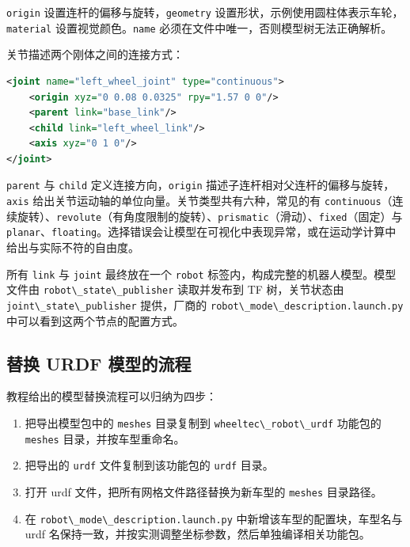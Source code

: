 \passthrough{\lstinline!origin!}
设置连杆的偏移与旋转，\passthrough{\lstinline!geometry!}
设置形状，示例使用圆柱体表示车轮，\passthrough{\lstinline!material!}
设置视觉颜色。\passthrough{\lstinline!name!}
必须在文件中唯一，否则模型树无法正确解析。

关节描述两个刚体之间的连接方式：

\begin{lstlisting}[language=XML]
<joint name="left_wheel_joint" type="continuous">
    <origin xyz="0 0.08 0.0325" rpy="1.57 0 0"/>
    <parent link="base_link"/>
    <child link="left_wheel_link"/>
    <axis xyz="0 1 0"/>
</joint>
\end{lstlisting}

\passthrough{\lstinline!parent!} 与 \passthrough{\lstinline!child!}
定义连接方向，\passthrough{\lstinline!origin!}
描述子连杆相对父连杆的偏移与旋转，\passthrough{\lstinline!axis!}
给出关节运动轴的单位向量。关节类型共有六种，常见的有
\passthrough{\lstinline!continuous!}（连续旋转）、\passthrough{\lstinline!revolute!}（有角度限制的旋转）、\passthrough{\lstinline!prismatic!}（滑动）、\passthrough{\lstinline!fixed!}（固定）与
\passthrough{\lstinline!planar!}、\passthrough{\lstinline!floating!}。选择错误会让模型在可视化中表现异常，或在运动学计算中给出与实际不符的自由度。

所有 \passthrough{\lstinline!link!} 与 \passthrough{\lstinline!joint!}
最终放在一个 \passthrough{\lstinline!robot!}
标签内，构成完整的机器人模型。模型文件由
\passthrough{\lstinline!robot\_state\_publisher!} 读取并发布到 TF
树，关节状态由 \passthrough{\lstinline!joint\_state\_publisher!}
提供，厂商的
\passthrough{\lstinline!robot\_mode\_description.launch.py!}
中可以看到这两个节点的配置方式。

\subsection{替换 URDF
模型的流程}\label{ux66ffux6362-urdf-ux6a21ux578bux7684ux6d41ux7a0b}

教程给出的模型替换流程可以归纳为四步：

\begin{enumerate}
\def\labelenumi{\arabic{enumi}.}
\tightlist
\item
  把导出模型包中的 \passthrough{\lstinline!meshes!} 目录复制到
  \passthrough{\lstinline!wheeltec\_robot\_urdf!} 功能包的
  \passthrough{\lstinline!meshes!} 目录，并按车型重命名。
\item
  把导出的 \passthrough{\lstinline!urdf!} 文件复制到该功能包的
  \passthrough{\lstinline!urdf!} 目录。
\item
  打开 urdf 文件，把所有网格文件路径替换为新车型的
  \passthrough{\lstinline!meshes!} 目录路径。
\item
  在 \passthrough{\lstinline!robot\_mode\_description.launch.py!}
  中新增该车型的配置块，车型名与 urdf
  名保持一致，并按实测调整坐标参数，然后单独编译相关功能包。
\end{enumerate}


